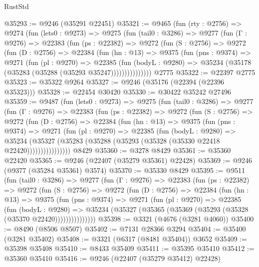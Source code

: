 \begin{lexlean}{RustStd}
\begin{coremodule}
@35293 := @9246 (@35291 @22451)
@35321 := @9465
    (fun (rty : @2756) =>
    @9274
      (fun (lets0 : @9273) =>
      @9275
        (fun (tail0 : @3286) =>
        @9277
          (fun (Γ : @9276) =>
          @22383
            (fun (ps : @22382) =>
            @9272
              (fun (S : @2756) =>
              @9272
                (fun (D : @2756) =>
                @22384
                  (fun (hn : @13) =>
                  @9375
                    (fun (pns : @9374) =>
                    @9271
                      (fun (pl : @9270) =>
                      @22385
                        (fun (bodyL : @9280) =>
                        @35234 (@35178 (@35283 (@35288 (@35293 @35247)))))))))))))))
    @2775
@35322 := @22397 @2775
@35323 := @35322 @9264
@35327 := @9246 (@35176 (@22394 (@22396 @35323)))
@35328 := @22454 @30420
@35330 := @30422 @35242 @27496
@35359 := @9487
    (fun (lets0 : @9273) =>
    @9275
      (fun (tail0 : @3286) =>
      @9277
        (fun (Γ : @9276) =>
        @22383
          (fun (ps : @22382) =>
          @9272
            (fun (S : @2756) =>
            @9272
              (fun (D : @2756) =>
              @22384
                (fun (hn : @13) =>
                @9375
                  (fun (pns : @9374) =>
                  @9271
                    (fun (pl : @9270) =>
                    @22385
                      (fun (bodyL : @9280) =>
                      @35234
                        (@35327
                          (@35283 (@35288 (@35293 (@35328 (@35330 @22418 @22420))))))))))))))))
    @8429
@35360 := @3278 @8429
@35361 := @35360 @22420
@35365 := @9246 (@22407 (@35279 @35361) @22428)
@35369 := @9246 (@9377 (@35284 @35361) @3574)
@35370 := @35330 @8429
@35395 := @9511
    (fun (tail0 : @3286) =>
    @9277
      (fun (Γ : @9276) =>
      @22383
        (fun (ps : @22382) =>
        @9272
          (fun (S : @2756) =>
          @9272
            (fun (D : @2756) =>
            @22384
              (fun (hn : @13) =>
              @9375
                (fun (pns : @9374) =>
                @9271
                  (fun (pl : @9270) =>
                  @22385
                    (fun (bodyL : @9280) =>
                    @35234 (@35327 (@35365 (@35369 (@35293 (@35328 (@35370 @22420)))))))))))))))
@35398 := @3321 (@4676 (@3281 @4060))
@35400 := @8490 (@8506 @8507)
@35402 := @7131 @28366 @3294
@35404 := @35400 (@3281 @35402)
@35408 := @3321 (@6317 (@8481 @35404)) @3652
@35409 := @35398 @35408
@35410 := @8433 @35409
@35411 := @35395 @35410
@35412 := @35360 @35410
@35416 := @9246 (@22407 (@35279 @35412) @22428)

\end{coremodule}
\end{lexlean}
